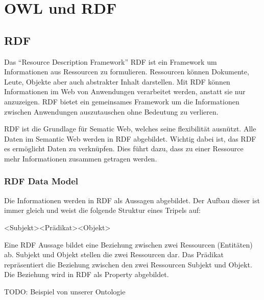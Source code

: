 \chapter{OWL und RDF}
\label{chap:owl_Rdf}

\section{RDF}
\label{sec:owlRdf_rdf}

Das "`Resource Description Framework"' RDF ist ein Framework um Informationen aus Ressourcen zu formulieren. Ressourcen können Dokumente, Leute, Objekte aber auch abstrakter Inhalt darstellen. Mit RDF können Informationen im Web von Anwendungen verarbeitet werden, anstatt sie nur anzuzeigen. RDF bietet ein gemeinsames Framework um die Informationen zwischen Anwendungen auszutauschen ohne Bedeutung zu verlieren. 

RDF ist die Grundlage für Sematic Web, welches seine flexibilität ausnützt. Alle Daten im Semantic Web werden in RDF abgebildet. Wichtig dabei ist, das RDF es ermöglicht Daten zu verknüpfen. Dies führt dazu, dass zu einer Ressource mehr Informationen zusammen getragen werden.

\subsection{RDF Data Model}
\label{sec:owlRdf_rdf_dataModel}
Die Informationen werden in RDF als Aussagen abgebildet. Der Aufbau dieser  ist immer gleich und weist die folgende Struktur eines Tripels auf:

\noindent\hspace*{15mm}<Subjekt><Prädikat><Objekt>

Eine RDF Aussage bildet eine Beziehung zwischen zwei Ressourcen (Entitäten) ab. 
Subjekt und Objekt stellen die zwei Ressourcen dar. Das Prädikat repräsentiert die Beziehung zwischen den zwei Ressourcen Subjekt und Objekt. Die Beziehung wird in RDF als Property abgebildet. 
 
TODO: Beispiel von unserer Ontologie


